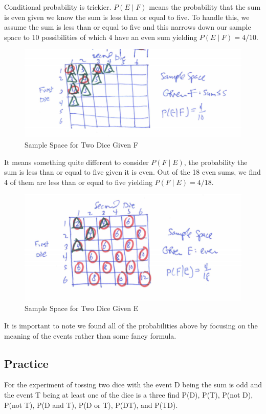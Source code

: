 \documentclass[]{book}
\theoremstyle{definition}
\theoremstyle{definition}
\theoremstyle{definition}
\theoremstyle{remark}
\begin{document}
Conditional probability is trickier. \(P(E \mid F)\) means the
probability that the sum is even given we know the sum is less than or
equal to five. To handle this, we assume the sum is less than or equal
to five and this narrows down our sample space to 10 possibilities of
which 4 have an even sum yielding \(P(E \mid F)=4/10\).

\begin{figure}

{\centering \includegraphics[width=0.3\linewidth]{01-basics-figures/two_dice_sample_space_given_F} 

}

\caption{Sample Space for Two Dice Given F}\label{fig:nice-fig-25}
\end{figure}

It means something quite different to consider \(P(F \mid E)\), the
probability the sum is less than or equal to five given it is even. Out
of the 18 even sums, we find 4 of them are less than or equal to five
yielding \(P(F \mid E)=4/18\).

\begin{figure}

{\centering \includegraphics[width=0.3\linewidth]{01-basics-figures/two_dice_sample_space_given_E} 

}

\caption{Sample Space for Two Dice Given E}\label{fig:nice-fig-26}
\end{figure}

It is important to note we found all of the probabilities above by
focusing on the meaning of the events rather than some fancy formula.

\subsection{Practice}\label{practice-1}

For the experiment of tossing two dice with the event D being the sum is
odd and the event T being at least one of the dice is a three find P(D),
P(T), P(not D), P(not T), P(D and T), P(D or T), P(D\textbar{}T), and
P(T\textbar{}D).
\end{document}
